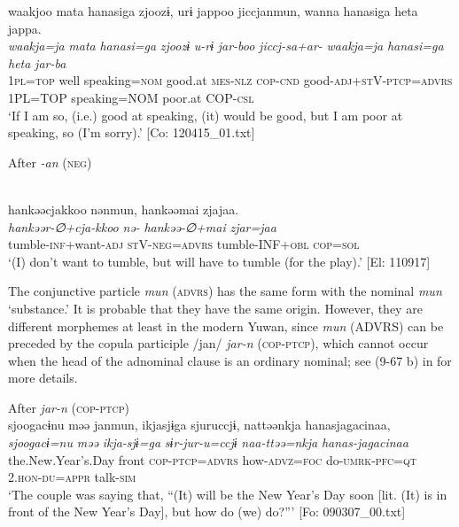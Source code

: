  \ex  %
      \glll    waakjoo  mata  hanasiga  zjoozɨ,  urɨ  jappoo  jiccjanmun,  wanna  hanasiga  {\textbar}heta{\textbar}  jappa.      \\
      \textit{waakja=ja}  \textit{mata}  \textit{hanasi=ga}  \textit{zjoozɨ}  \textit{u-rɨ}  \textit{jar-boo}   \textit{jiccj-sa+ar-}  \textit{waakja=ja}  \textit{hanasi=ga}  \textit{heta}  \textit{jar-ba}      \\
      1\textsc{pl}=\textsc{top}  well  speaking=\textsc{nom}  good.at  \textsc{mes}-\textsc{nlz}  \textsc{cop}-\textsc{cnd}   good-\textsc{adj}+\textsc{st}V-\textsc{ptcp}=\textsc{advrs}  1PL=TOP  speaking=NOM  poor.at  COP-\textsc{csl}  \\
      \glt       ‘If I am so, (i.e.) good at speaking, (it) would be good, but I am poor at speaking, so (I’m sorry).’ [Co: 120415\_01.txt]

  \exi{} After \textit{{}-an} (\textsc{neg})

  \ex\relax  [= (9-50 b)]\\
      \glll    hankəəcjakkoo  nənmun,  hankəəmai  zjajaa.\\
      \textit{hankəər-∅+cja-kkoo}  \textit{nə-}  \textit{hankəə-∅+mai}  \textit{zjar=jaa}\\
      tumble-\textsc{inf}+want-\textsc{adj}  \textsc{st}V-\textsc{neg}=\textsc{advrs}  tumble-INF+\textsc{obl}  \textsc{cop}=\textsc{sol}\\
      \glt       ‘(I) don’t want to tumble, but will have to tumble (for the play).’ [El: 110917]
    \z
\z

  The conjunctive particle \textit{mun} (\textsc{advrs}) has the same form with the nominal \textit{mun} ‘substance.’ It is probable that they have the same origin. However, they are different morphemes at least in the modern Yuwan, since \textit{mun} (ADVRS) can be preceded by the copula participle /jan/ \textit{jar-n} (\textsc{cop}-\textsc{ptcp}), which cannot occur when the head of the adnominal clause is an ordinary nominal; see (9-67 b) in  for more details.

\ea\label{ex:10.32}   After \textit{jar-n} (\textsc{cop}-\textsc{ptcp})\\
      \glll    sjoogacɨnu  məə  janmun,  ikjasjɨga  sjuruccjɨ,  nattəənkja  hanasjagacinaa,\\
    \textit{sjoogacɨ=nu}  \textit{məə}  \textit{}  \textit{ikja-sjɨ=ga}   \textit{sɨr-jur-u=ccjɨ}  \textit{naa-ttəə=nkja}  \textit{hanas-jagacinaa}\\
    the.New.Year’s.Day  front  \textsc{cop}-\textsc{ptcp}=\textsc{advrs}  how-\textsc{advz}=\textsc{foc}  do-\textsc{umrk}-\textsc{pfc}=\textsc{qt}  2.\textsc{hon}-\textsc{du}=\textsc{appr}  talk-\textsc{sim}\\
    \glt     ‘The couple was saying that, “(It) will be the New Year’s Day soon [lit. (It) is in front of the New Year’s Day], but how do (we) do?”’ [Fo: 090307\_00.txt]
\z

